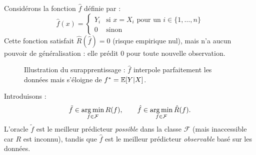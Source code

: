 \begin{exemple}
Considérons la fonction $\hat{f}$ définie par :
\[
\hat{f}(x) = \begin{cases} Y_i & \text{si } x = X_i \text{ pour un } i \in \{1,\ldots,n\} \\ 0 & \text{sinon} \end{cases}
\]
Cette fonction satisfait $\hat{R}(\hat{f}) = 0$ (risque empirique nul), mais n'a aucun pouvoir de généralisation : elle prédit 0 pour toute nouvelle observation.
\end{exemple}


\begin{figure}[H]
    \centering
    \caption{Illustration du surapprentissage : $\hat{f}$ interpole parfaitement les données mais s'éloigne de $f^* = \mathbb{E}[Y|X]$.}
    \label{fig:overfitting}
\end{figure}

\begin{remarque}
Introduisons :
\begin{equation}
\tilde{f} \in \operatorname*{arg\,min}_{f \in \mathcal{F}} R(f), \qquad \hat{f} \in \operatorname*{arg\,min}_{f \in \mathcal{F}} \hat{R}(f).
\end{equation}
L'oracle $\tilde{f}$ est le meilleur prédicteur \emph{possible} dans la classe $\mathcal{F}$ (mais inaccessible car $R$ est inconnu), tandis que $\hat{f}$ est le meilleur prédicteur \emph{observable} basé sur les données.
\end{remarque}

